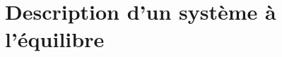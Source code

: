 \documentclass[../main/main.tex]{subfiles}
\begin{document}
\setcounter{chapter}{0}

\chapter{Description d'un système à l'équilibre}
\end{document}
